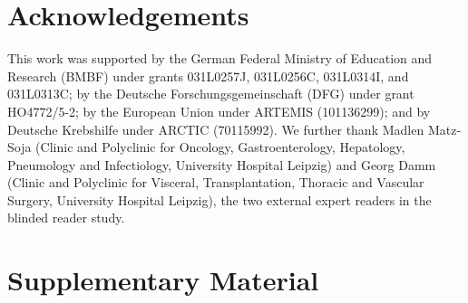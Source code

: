 \documentclass{bmvc2k}
\begin{document}
\section*{Acknowledgements}

\sloppypar
This work was supported by the German Federal Ministry of Education and Research (BMBF)
under grants 031L0257J, 031L0256C, 031L0314I, and 031L0313C; by the Deutsche
Forschungs\-gemein\-schaft (DFG) under grant HO4772/5-2; by the European Union under
ARTEMIS (101136299); and by Deutsche Krebshilfe under ARCTIC (70115992).
We further thank Madlen Matz-Soja (Clinic and Polyclinic for Oncology,
Gastroenterology, Hepatology, Pneumology and Infectiology, University Hospital Leipzig)
and Georg Damm (Clinic and Polyclinic for Visceral, Transplantation, Thoracic and
Vascular Surgery, University Hospital Leipzig), the two external expert readers in the
blinded reader study.
\par



\clearpage

\setcounter{section}{0}
\setcounter{figure}{0}
\setcounter{table}{0}
\setcounter{equation}{0}
\renewcommand{\thesection}{S\arabic{section}}
\renewcommand{\thesubsection}{S\arabic{section}.\arabic{subsection}}
\renewcommand{\thefigure}{S\arabic{figure}}
\renewcommand{\thetable}{S\arabic{table}}
\renewcommand{\theequation}{S\arabic{equation}}

\section*{Supplementary Material}


\end{document}
